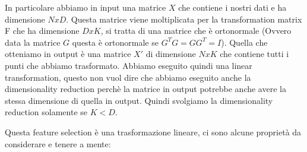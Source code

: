 \documentclass[14pt]{extreport}
\begin{document}
In particolare abbiamo in input una matrice $X$ che contiene i nostri dati e ha dimensione $NxD$. Questa matrice viene moltiplicata per la
transformation matrix F che ha dimensione $DxK$, si tratta di una matrice che è ortonormale (Ovvero data la matrice $G$ questa è ortonormale se
$G^TG=GG^T=I$). Quella che otteniamo in output è una matrice $X'$ di dimensione $NxK$ che contiene tutti i punti che abbiamo trasformato. Abbiamo
eseguito quindi una linear transformation, questo non vuol dire che abbiamo eseguito anche la dimensionality reduction perchè la matrice in output
potrebbe anche avere la stessa dimensione di quella in output. Quindi svolgiamo la dimensionality reduction solamente se $K<D$.

Questa feature selection è una trasformazione lineare, ci sono alcune proprietà da considerare e tenere a mente:
\end{document}
